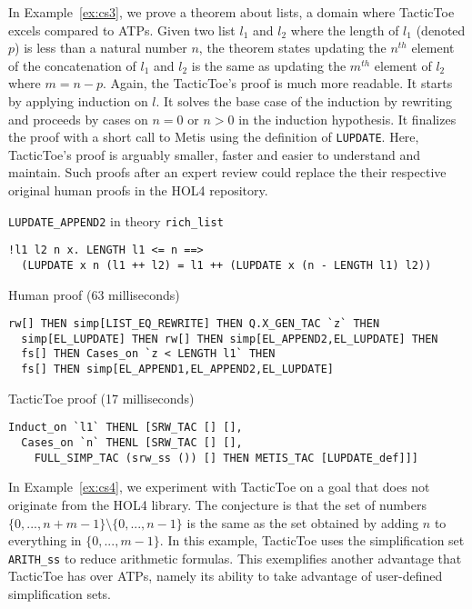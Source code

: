 \documentclass[runningheads,a4paper,draft]{svjour3}
\def\holfour{\textsf{HOL4}\xspace}
\def\metis{\textsf{Metis}\xspace}
\def\tactictoe{\textsf{TacticToe}\xspace}
\begin{document}
In Example~\ref{ex:cs3}, we prove a theorem about lists, a domain where \tactictoe excels compared to ATPs.
Given two list $l_1$ and $l_2$ where the length of $l_1$ (denoted $p$) is less
than a natural
number $n$, the theorem states updating the $n^{th}$
element of the concatenation of $l_1$ and $l_2$ is the same as
updating the $m^{th}$ element of $l_2$ where $m = n - p$. Again, the
\tactictoe's proof is
much more readable. It starts by applying induction on $l$. It solves the base
case of the induction by rewriting and proceeds by cases on $n=0$ or $n>0$
in the induction hypothesis. It finalizes the proof with a short call to \metis
using the definition of
\texttt{LUPDATE}. Here, \tactictoe's proof is arguably smaller, faster and
easier to
understand and maintain. Such proofs after an expert review could replace the
their respective original human proofs in the \holfour repository.

\begin{example}\label{ex:cs3} \texttt{LUPDATE\_APPEND2} in theory
\texttt{rich\_list}
\begin{lstlisting}[language=SMLSmall]
!l1 l2 n x. LENGTH l1 <= n ==>
  (LUPDATE x n (l1 ++ l2) = l1 ++ (LUPDATE x (n - LENGTH l1) l2))
\end{lstlisting}
Human proof (63 milliseconds)
\begin{lstlisting}[language=SMLSmall]
  rw[] THEN simp[LIST_EQ_REWRITE] THEN Q.X_GEN_TAC `z` THEN
  simp[EL_LUPDATE] THEN rw[] THEN simp[EL_APPEND2,EL_LUPDATE] THEN
  fs[] THEN Cases_on `z < LENGTH l1` THEN
  fs[] THEN simp[EL_APPEND1,EL_APPEND2,EL_LUPDATE]
\end{lstlisting}
\tactictoe proof (17 milliseconds)
\begin{lstlisting}[language=SMLSmall]
Induct_on `l1` THENL [SRW_TAC [] [],
  Cases_on `n` THENL [SRW_TAC [] [],
    FULL_SIMP_TAC (srw_ss ()) [] THEN METIS_TAC [LUPDATE_def]]]
\end{lstlisting}
\end{example}

In Example~\ref{ex:cs4}, we experiment with \tactictoe on a
goal that does not originate from the \holfour library. The conjecture is
that the set of
numbers $\{0,...,n+m-1\} \setminus \{0,...,n-1\}$ is the same as the set
obtained by adding $n$ to everything in $\{0,...,m-1\}$. In this example,
\tactictoe uses the simplification set \texttt{ARITH\_ss} to reduce arithmetic
formulas. This exemplifies another advantage that \tactictoe has over ATPs,
namely its ability to take advantage of user-defined simplification sets.
\end{document}
